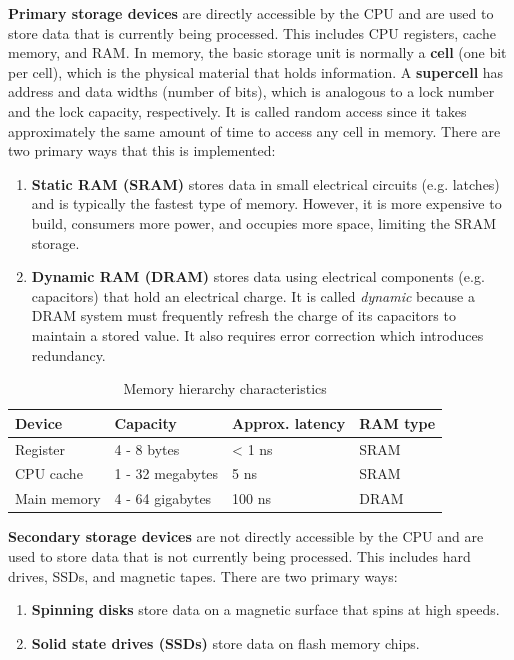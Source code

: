   \begin{definition}
    \label{def:primary-storage}
    \textbf{Primary storage devices} are directly accessible by the CPU and are used to store data that is currently being processed. This includes CPU registers, cache memory, and RAM. In memory, the basic storage unit is normally a \textbf{cell} (one bit per cell), which is the physical material that holds information. A \textbf{supercell} has address and data widths (number of bits), which is analogous to a lock number and the lock capacity, respectively. It is called random access since it takes approximately the same amount of time to access any cell in memory. There are two primary ways that this is implemented:  
    \begin{enumerate}
      \item \textbf{Static RAM (SRAM)} stores data in small electrical circuits (e.g. latches) and is typically the fastest type of memory. However, it is more expensive to build, consumers more power, and occupies more space, limiting the SRAM storage. 
      \item \textbf{Dynamic RAM (DRAM)} stores data using electrical components (e.g. capacitors) that hold an electrical charge. It is called \textit{dynamic} because a DRAM system must frequently refresh the charge of its capacitors to maintain a stored value. It also requires error correction which introduces redundancy. 
    \end{enumerate}

    \begin{table}[H]
      \centering
      \begin{tabular}{|l|l|l|l|}
      \hline
      \textbf{Device} & \textbf{Capacity} & \textbf{Approx. latency} & \textbf{RAM type} \\ \hline
      Register & 4 - 8 bytes & < 1 ns & SRAM \\ \hline
      CPU cache & 1 - 32 megabytes & 5 ns & SRAM \\ \hline
      Main memory & 4 - 64 gigabytes & 100 ns & DRAM \\ \hline
      \end{tabular}
      \caption{Memory hierarchy characteristics}
      \label{tab:memory_hierarchy}
    \end{table}
  \end{definition}

  \begin{definition}
    \label{def:secondary-storage}
    \textbf{Secondary storage devices} are not directly accessible by the CPU and are used to store data that is not currently being processed. This includes hard drives, SSDs, and magnetic tapes. There are two primary ways: 
    \begin{enumerate}
      \item \textbf{Spinning disks} store data on a magnetic surface that spins at high speeds.
      \item \textbf{Solid state drives (SSDs)} store data on flash memory chips.
    \end{enumerate}
  \end{definition}

